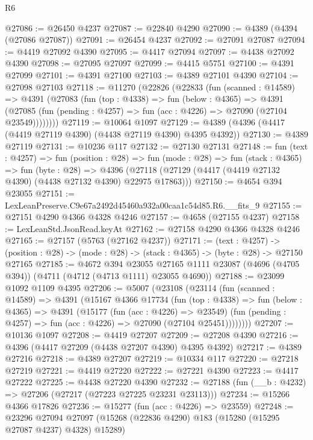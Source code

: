 \begin{lexlean}{R6}
\begin{coremodule}
@27086 := @26450 @4237
@27087 := @22840 @4290
@27090 := @4389 (@4394 (@27086 @27087))
@27091 := @26454 @4237
@27092 := @27091 @27087
@27094 := @4419 @27092 @4390
@27095 := @4417 @27094
@27097 := @4438 @27092 @4390
@27098 := @27095 @27097
@27099 := @4415 @5751
@27100 := @4391 @27099
@27101 := @4391 @27100
@27103 := @4389 @27101 @4390
@27104 := @27098 @27103
@27118 := @11270
    (@22826
      (@22833
        (fun (scanned : @14589) =>
        @4391
          (@27083
            (fun (top : @4338) =>
            fun (below : @4365) =>
            @4391
              (@27085 (fun (pending : @4257) => fun (acc : @4226) => @27090 (@27104 @23549))))))))
@27119 := @10064 @1097
@27129 := @4389 (@4396 (@4417 (@4419 @27119 @4390) (@4438 @27119 @4390) @4395 @4392))
@27130 := @4389 @27119
@27131 := @10236 @117
@27132 := @27130 @27131
@27148 := fun (text : @4257) =>
  fun (position : @28) =>
  fun (mode : @28) =>
  fun (stack : @4365) =>
  fun (byte : @28) =>
  @4396 (@27118 (@27129 (@4417 (@4419 @27132 @4390) (@4438 @27132 @4390) @22975 @17863)))
@27150 := @4654 @394 @23055
@27151 := LexLeanPreserve.C9e67a2492d45460a932a00caa1c54d85.R6.__fits_9
@27155 := @27151 @4290 @4366 @4328 @4246
@27157 := @4658 (@27155 @4237)
@27158 := LexLeanStd.JsonRead.keyAt
@27162 := @27158 @4290 @4366 @4328 @4246
@27165 := @27157 (@5763 (@27162 @4237))
@27171 := (text : @4257) ->
  (position : @28) -> (mode : @28) -> (stack : @4365) -> (byte : @28) -> @27150 @27165
@27185 := @4672
    @394
    @23055
    @27165
    @1111
    @23087
    (@4696 (@4705 @394))
    (@4711 (@4712 (@4713 @1111) @23055 @4690))
@27188 := @23099 @1092 @1109 @4395
@27206 := @5007
    (@23108
      (@23114
        (fun (scanned : @14589) =>
        @4391
          (@15167
            @4366
            @17734
            (fun (top : @4338) =>
            fun (below : @4365) =>
            @4391
              (@15177
                (fun (acc : @4226) => @23549)
                (fun (pending : @4257) => fun (acc : @4226) => @27090 (@27104 @25451))))))))
@27207 := @10136 @1097
@27208 := @4419 @27207
@27209 := @27208 @4390
@27216 := @4396 (@4417 @27209 (@4438 @27207 @4390) @4395 @4392)
@27217 := @4389 @27216
@27218 := @4389 @27207
@27219 := @10334 @117
@27220 := @27218 @27219
@27221 := @4419 @27220
@27222 := @27221 @4390
@27223 := @4417 @27222
@27225 := @4438 @27220 @4390
@27232 := @27188 (fun (__b : @4232) => @27206 (@27217 (@27223 @27225 @23231 @23113)))
@27234 := @15266 @4366 @17826
@27236 := @15277 (fun (acc : @4226) => @23559)
@27248 := @23296
    @27094
    @27097
    (@15268 (@22836 @4290) @183 (@15280 (@15295 @27087 @4237) @4328) @15289)

\end{coremodule}
\end{lexlean}
